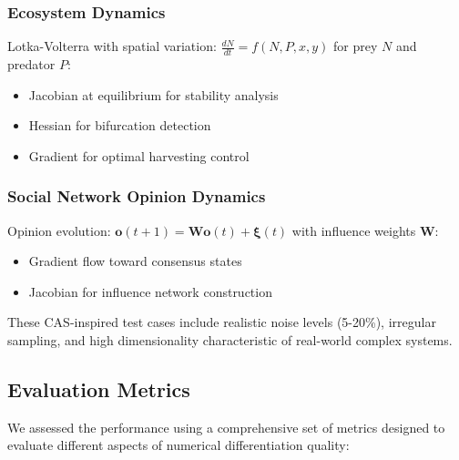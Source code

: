 \documentclass[10pt,journal,compsoc]{IEEEtran}
\begin{document}
\subsubsection{Ecosystem Dynamics}

Lotka-Volterra with spatial variation: $\frac{dN}{dt} = f(N, P, x, y)$ for prey $N$ and predator $P$:
\begin{itemize}
    \item Jacobian at equilibrium for stability analysis
    \item Hessian for bifurcation detection
    \item Gradient for optimal harvesting control
\end{itemize}

\subsubsection{Social Network Opinion Dynamics}

Opinion evolution: $\mathbf{o}(t+1) = \mathbf{W}\mathbf{o}(t) + \boldsymbol{\xi}(t)$ with influence weights $\mathbf{W}$:
\begin{itemize}
    \item Gradient flow toward consensus states
    \item Jacobian for influence network construction
\end{itemize}

These CAS-inspired test cases include realistic noise levels (5-20\%), irregular sampling, and high dimensionality characteristic of real-world complex systems.

\subsection{Evaluation Metrics}

We assessed the performance using a comprehensive set of metrics designed to evaluate different aspects of numerical differentiation quality:
\end{document}
